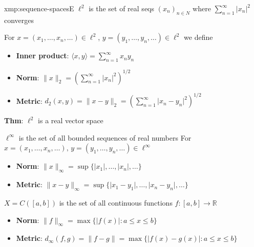 \documentclass[landscape, 8pt]{extarticle}
\begin{document}
\begin{multicols}{3}
\begin{xmp}{xmp:sequence-spaces}{E}
    $\ell^{2}$ is the set of real seqs $(x_{n})_{n\in N}$ where $\sum_{n = 1}^{\infty} \lvert x_{n} \rvert^{2}$ converges

    For $x = (x_{1},\dots,x_{n},\dots)\in \ell^{2}$, $y = (y_{1},\dots,y_{n},\dots)\in \ell^{2}$ we define
    \vspace{-6pt}

    \begin{itemize}[leftmargin=*]
        \item \textbf{Inner product}: $\langle x, y \rangle = \sum_{n = 1}^{\infty} x_{n}y_{n}$
        \item \textbf{Norm}: $\lVert x \rVert_{2} = \left(\sum_{n = 1}^{\infty}\lvert x_{n} \rvert^{2}\right)^{1 /2}$
        \item \textbf{Metric}: $d_{2}(x, y) = \lVert x - y \rVert_{2} = \left(\sum_{n = 1}^{\infty}\lvert x_{n} - y_{n} \rvert^{2}\right)^{1 /2}$
    \end{itemize}

    \vspace{-3pt}
    \textbf{Thm}: $\ell^{2}$ is a real vector space


    $\ell^{\infty}$ is the set of all bounded sequences of real numbers
    For $x = (x_{1},\dots,x_{n},\dots),\,y = (y_{1},\dots,y_{n},\dots)\in \ell^{\infty}$
    \vspace{-3pt}
    \begin{itemize}[leftmargin=*]
        \item \textbf{Norm}: $\lVert x \rVert_{\infty} = \sup \{\lvert x_{1} \rvert,\dots,\lvert x_{n} \rvert,\dots\}$
        \item \textbf{Metric}: $\lVert x - y \rVert_{\infty} = \sup \{\lvert x_{1} - y_{1} \rvert,\dots,\lvert x_{n} - y_{n} \rvert,\dots\}$
    \end{itemize}

    \vspace{-3pt}

    $X = C([a, b])$ is the set of all continuous functions $f : [a, b]\to \mathbb{R}$
    \vspace{-3pt}
    \begin{itemize}[leftmargin=*]
        \item \textbf{Norm}: $\lVert f \rVert_{\infty} = \max \{ \lvert f(x) \rvert : a \le x \le b\}$
        \item \textbf{Metric}: $d_{\infty}(f, g) = \lVert f - g \rVert = \max \{\lvert f(x) - g(x) \rvert : a \le x \le b\}$
    \end{itemize}


\end{xmp}
\end{multicols}
\end{document}
